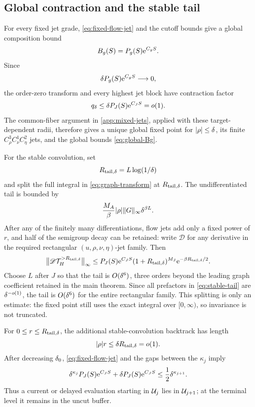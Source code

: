 \subsection{Global contraction and the stable tail}

For every fixed jet grade, \cref{eq:fixed-flow-jet} and the cutoff bounds
give a global composition bound
\begin{equation}
\label{eq:global-Bg}
 B_g(S)=P_g(S)\mathrm e^{C_gS}.
\end{equation}
Since
\[
 \delta P_g(S)\mathrm e^{C_gS}\longrightarrow0,
\]
the order-zero transform and every highest jet block have contraction
factor
\begin{equation}
\label{eq:growing-contraction}
 q_\delta\le\delta P_J(S)\mathrm e^{C_JS}=o(1).
\end{equation}
The common-fiber argument in \cref{app:mixed-jets}, applied with these
target-dependent radii, therefore gives a unique global fixed point for
\(|\rho|\le\delta\), its finite \(C_\rho^3C_\nu^1C_\eta^2\) jets, and the
global bounds \cref{eq:global-Bg}.

For the stable convolution, set
\[
 R_{{\rm tail},\delta}=L\log(1/\delta)
\]
and split the full integral in \cref{eq:graph-transform} at
\(R_{{\rm tail},\delta}\).  The undifferentiated tail is bounded by
\[
 \frac{M_A}{\beta}|\rho|\|G\|_\infty\delta^{\beta L}.
\]
After any of the finitely many differentiations, flow jets add only a fixed
power of \(r\), and half of the semigroup decay can be retained:
write \(\mathscr D\) for any derivative in the required rectangular
\((u,\rho,\nu,\eta)\)-jet family.  Then
\begin{equation}
\label{eq:stable-tail}
 \bigl\|\mathscr D\mathcal T_H^{>R_{{\rm tail},\delta}}\bigr\|_\infty
 \le P_J(S)\mathrm e^{C_JS}(1+R_{{\rm tail},\delta})^{M_J}
      \mathrm e^{-\beta R_{{\rm tail},\delta}/2}.
\end{equation}
Choose \(L\) after \(J\) so that the tail is \(O(\delta^6)\), three orders
beyond the leading graph coefficient retained in the main theorem.  Since all
prefactors in \cref{eq:stable-tail} are \(\delta^{-o(1)}\), the tail is
\(O(\delta^6)\) for the entire rectangular family.  This splitting is only
an estimate: the fixed point still uses the exact integral over
\([0,\infty)\), so invariance is not truncated.

For \(0\le r\le R_{{\rm tail},\delta}\), the additional
stable-convolution backtrack has
length
\[
 |\rho|r\le\delta R_{{\rm tail},\delta}=o(1).
\]
After decreasing \(\delta_0\), \cref{eq:fixed-flow-jet} and the gaps between
the \(\kappa_j\) imply
\begin{equation}
\label{eq:nested-inclusion}
 \delta^{\kappa_j}P_J(S)\mathrm e^{C_JS}
 +\delta P_J(S)\mathrm e^{C_JS}
 \le\frac12\delta^{\kappa_{j+1}}.
\end{equation}
Thus a current or delayed evaluation starting in \(\mathcal U_j\) lies in
\(\mathcal U_{j+1}\); at the terminal level it remains in the uncut buffer.

